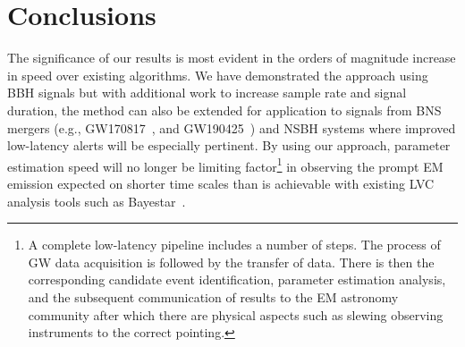 \documentclass{article}
\begin{document}
%
%

%
%
%
\section{Conclusions}


%
%
The significance of our results is most evident in the orders of magnitude
increase in speed over existing algorithms. We have demonstrated the approach
using \ac{BBH} signals but with additional work to increase sample rate
and signal duration, the method can also be extended for application to
signals from \ac{BNS} mergers (e.g., GW170817~\cite{PhysRevLett.119.161101},
and GW190425~\cite{2020ApJ...892L...3A}) and \ac{NSBH} systems where
improved low-latency alerts will be especially pertinent. By using our
approach, parameter estimation speed will no longer be limiting
factor\footnote{A complete low-latency pipeline includes a number of
steps. The process of \ac{GW} data acquisition is followed by the transfer of
data. There is then the corresponding candidate event identification,
parameter estimation analysis, and the subsequent communication of results to
the \ac{EM} astronomy community after which there are physical aspects such as
slewing observing instruments to the correct pointing.} in observing the prompt
\ac{EM} emission expected on shorter time scales than is achievable with
existing \ac{LVC} analysis tools such as Bayestar~\cite{2016PhRvD..93b4013S}.
\end{document}
